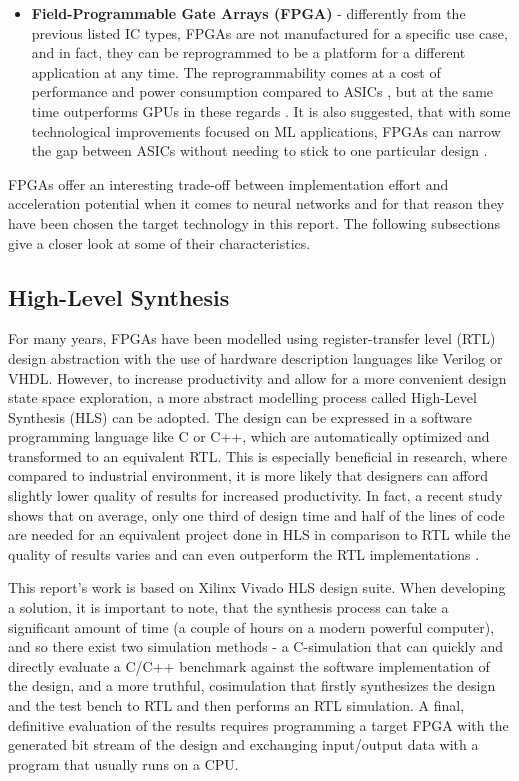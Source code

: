 \begin{itemize}
  \item \textbf{Field-Programmable Gate Arrays (FPGA)} - differently from the previous listed IC types, FPGAs are not manufactured for a specific use case, and in fact, they can be reprogrammed to be a platform for a different application at any time. The reprogrammability comes at a cost of performance and power consumption compared to ASICs \cite{25-boutros2018improve}, but at the same time outperforms GPUs in these regards \cite{27-nurvitadhi2017fpgas, 28-li2018gpu-outperforming}. It is also suggested, that with some technological improvements focused on ML applications, FPGAs can narrow the gap between ASICs without needing to stick to one particular design \cite{25-boutros2018improve, 26-nurvitadhi2016accelerating, 15-nurvitadhi2016accelerating}.

\end{itemize}

FPGAs offer an interesting trade-off between implementation effort and acceleration potential when it comes to neural networks and for that reason they have been chosen the target technology in this report. The following subsections give a closer look at some of their characteristics.

\subsection{High-Level Synthesis}
For many years, FPGAs have been modelled using register-transfer level (RTL) design abstraction with the use of hardware description languages like Verilog or VHDL. However, to increase productivity and allow for a more convenient design state space exploration, a more abstract modelling process called High-Level Synthesis (HLS) can be adopted. The design can be expressed in a software programming language like C or C++, which are automatically optimized and transformed to an equivalent RTL. This is especially beneficial in research, where compared to industrial environment, it is more likely that designers can afford slightly lower quality of results for increased productivity. In fact, a recent study shows that on average, only one third of design time and half of the lines of code are needed for an equivalent project done in HLS in comparison to RTL while the quality of results varies and can even outperform the RTL implementations \cite{30-lahti2019yet?}.

This report's work is based on Xilinx Vivado HLS design suite. When developing a solution, it is important to note, that the synthesis process can take a significant amount of time (a couple of hours on a modern powerful computer), and so there exist two simulation methods - a C-simulation that can quickly and directly evaluate a C/C++ benchmark against the software implementation of the design, and a more truthful, cosimulation that firstly synthesizes the design and the test bench to RTL and then performs an RTL simulation. A final, definitive evaluation of the results requires programming a target FPGA with the generated bit stream of the design and exchanging input/output data with a program that usually runs on a CPU.


